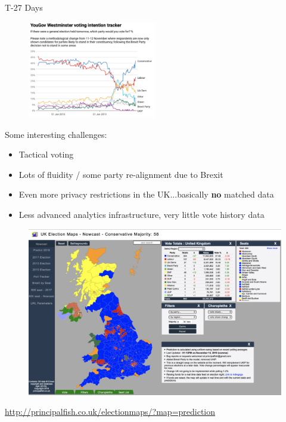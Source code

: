 \documentclass[ignorenonframetext,]{beamer}
\providecommand{\tightlist}{%
  \setlength{\itemsep}{0pt}\setlength{\parskip}{0pt}}
\begin{document}
\begin{frame}{T-27 Days}
\begin{figure}
	\includegraphics[width=0.5\textwidth]{photos/yougov_ge2019.png}
\end{figure}

Some interesting challenges:
\begin{itemize}
	\tightlist
	\item Tactical voting
	\item Lots of fluidity / some party re-alignment due to Brexit
	\item Even more privacy restrictions in the UK...basically \textbf{no} matched data
	\item Less advanced analytics infrastructure, very little vote history data
\end{itemize}
\end{frame}

\begin{frame}
\begin{figure}
	\includegraphics[width=\textwidth]{photos/principalfish_projection.png}
	\end{figure}

\small
\href{http://principalfish.co.uk/electionmaps/?map=prediction}{http://principalfish.co.uk/electionmaps/?map=prediction}
\end{frame}
\end{document}
